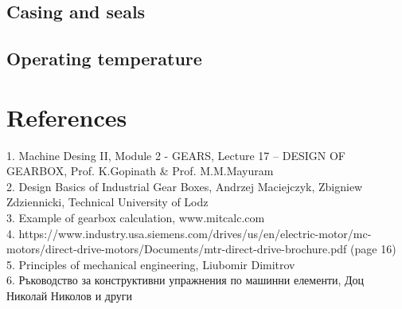 \documentclass{article}
\begin{document}
\subsection{Casing and seals}
\subsection{Operating temperature}

\section{References}
1. Machine Desing II, Module 2 - GEARS, Lecture 17 – DESIGN OF GEARBOX, Prof. K.Gopinath \& Prof. M.M.Mayuram \\
2. Design Basics of Industrial Gear Boxes, Andrzej Maciejczyk, Zbigniew Zdziennicki, Technical University of Lodz \\
3. Example of gearbox calculation, www.mitcalc.com \\
4. https://www.industry.usa.siemens.com/drives/us/en/electric-motor/mc-motors/direct-drive-motors/Documents/mtr-direct-drive-brochure.pdf  (page 16) \\
5. Principles of mechanical engineering, Liubomir Dimitrov  \\
6. Ръководство за конструктивни упражнения по машинни елементи, Доц Николай Николов и други

\tableofcontents
\end{document}
